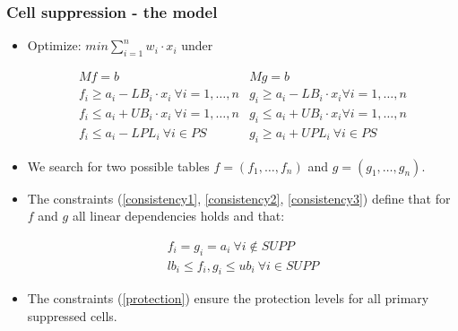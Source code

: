 \begin{frame}\frametitle{Cell suppression - the model}
	\begin{itemize}
	\item Optimize: $min \sum_{i=1}^n w_i \cdot x_i$ under \pause
			\begin{scriptsize}
				\begin{eqnarray}
				M f = b & M g = b \label{consistency1}\\
				f_i \geq a_i - LB_i \cdot x_i ~ \forall i=1,\ldots,n & g_i \geq a_i - LB_i \cdot x_i \forall i=1,\ldots,n \label{consistency2}\\
				f_i \leq a_i + UB_i \cdot x_i ~ \forall i=1,\ldots,n & g_i \leq a_i + UB_i \cdot x_i \forall i=1,\ldots,n \label{consistency3}\\
				f_i \leq a_i - LPL_i ~ \forall i \in PS & g_i \geq a_i + UPL_i ~ \forall i \in PS	 \label{protection}
			\end{eqnarray}
		\end{scriptsize}	\pause
		\vspace{-0.2cm}
		\item We search for two possible tables $f=(f_1,\ldots,f_n)$	and $g=(g_1,\ldots,g_n)$.\pause
		\item The constraints (\ref{consistency1}, \ref{consistency2}, \ref{consistency3}) define that for $f$ and $g$ all linear dependencies holds and that:\pause
		\begin{scriptsize}
		\begin{eqnarray}
		f_i = g_i = a_i ~ \forall i \notin SUPP \\
		lb_i \leq f_i, g_i \leq ub_i ~ \forall i \in SUPP
		\end{eqnarray}
		\end{scriptsize} \pause
		\vspace{-0.2cm}
		\item The constraints (\ref{protection}) ensure the protection levels for all primary suppressed cells.
	\end{itemize}
\end{frame}

